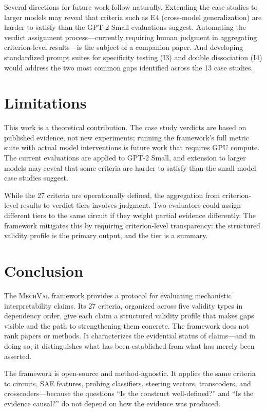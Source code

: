 \documentclass[10pt]{article}
\newcommand{\mechval}{\textsc{MechVal}}
\begin{document}
Several directions for future work follow naturally. Extending the case studies to larger models may reveal that criteria such as E4 (cross-model generalization) are harder to satisfy than the GPT-2 Small evaluations suggest. Automating the verdict assignment process---currently requiring human judgment in aggregating criterion-level results---is the subject of a companion paper. And developing standardized prompt suites for specificity testing (I3) and double dissociation (I4) would address the two most common gaps identified across the 13 case studies.

\section{Limitations}
\label{sec:limitations}

This work is a theoretical contribution. The case study verdicts are based on published evidence, not new experiments; running the framework's full metric suite with actual model interventions is future work that requires GPU compute. The current evaluations are applied to GPT-2 Small, and extension to larger models may reveal that some criteria are harder to satisfy than the small-model case studies suggest.

While the 27 criteria are operationally defined, the aggregation from criterion-level results to verdict tiers involves judgment. Two evaluators could assign different tiers to the same circuit if they weight partial evidence differently. The framework mitigates this by requiring criterion-level transparency: the structured validity profile is the primary output, and the tier is a summary.

\section{Conclusion}
\label{sec:conclusion}

The \mechval{} framework provides a protocol for evaluating mechanistic interpretability claims. Its 27 criteria, organized across five validity types in dependency order, give each claim a structured validity profile that makes gaps visible and the path to strengthening them concrete. The framework does not rank papers or methods. It characterizes the evidential status of claims---and in doing so, it distinguishes what has been established from what has merely been asserted.

The framework is open-source and method-agnostic. It applies the same criteria to circuits, SAE features, probing classifiers, steering vectors, transcoders, and crosscoders---because the questions ``Is the construct well-defined?'' and ``Is the evidence causal?'' do not depend on how the evidence was produced.
\end{document}
